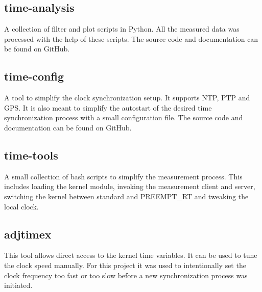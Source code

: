 \subsection{time-analysis}

A collection of filter and plot scripts in Python. All the measured data was processed with the help of these scripts. The source code and documentation can be found on GitHub.

\subsection{time-config}

A tool to simplify the clock synchronization setup. It supports NTP, PTP and GPS. It is also meant to simplify the autostart of the desired time synchronization process with a small configuration file. The source code and documentation can be found on GitHub.

\subsection{time-tools}

A small collection of bash scripts to simplify the measurement process. This includes loading the kernel module, invoking the measurement client and server, switching the kernel between standard and PREEMPT\_RT and tweaking the local clock.

\subsection{adjtimex}

This tool allows direct access to the kernel time variables. It can be used to tune the clock speed manually. For this project it was used to intentionally set the clock frequency too fast or too slow before a new synchronization process was initiated.

